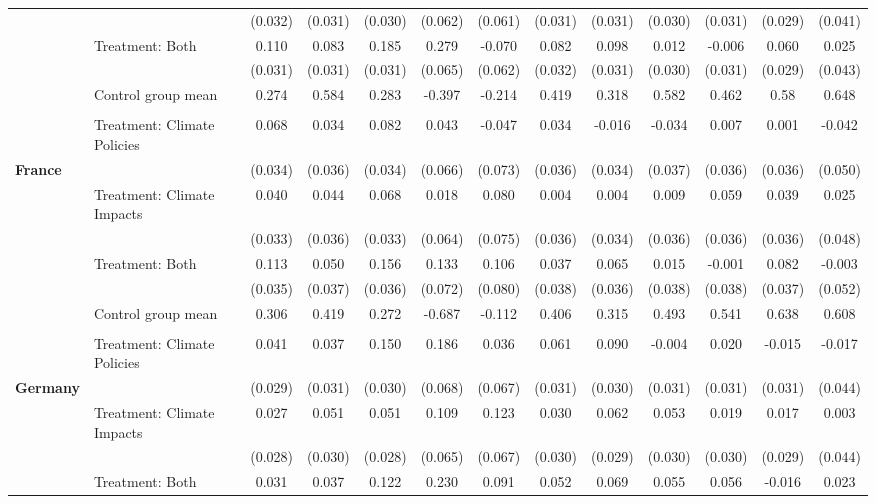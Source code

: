 \begin{tabular}[t]{llccccccccccc}
 &  & (0.032) & (0.031) & (0.030) & (0.062) & (0.061) & (0.031) & (0.031) & (0.030) & (0.031) & (0.029) & (0.041)\\
 & Treatment: Both & 0.110 & 0.083 & 0.185 & 0.279 & -0.070 & 0.082 & 0.098 & 0.012 & -0.006 & 0.060 & 0.025\\
 &  & (0.031) & (0.031) & (0.031) & (0.065) & (0.062) & (0.032) & (0.031) & (0.030) & (0.031) & (0.029) & (0.043)\\
\midrule
 & Control group mean & 0.274 & 0.584 & 0.283 & -0.397 & -0.214 & 0.419 & 0.318 & 0.582 & 0.462 & 0.58 & 0.648\\
 &  &  &  &  &  &  &  &  &  &  &  & \\
 & Treatment: Climate Policies & 0.068 & 0.034 & 0.082 & 0.043 & -0.047 & 0.034 & -0.016 & -0.034 & 0.007 & 0.001 & -0.042\\
\textbf{France} &  & (0.034) & (0.036) & (0.034) & (0.066) & (0.073) & (0.036) & (0.034) & (0.037) & (0.036) & (0.036) & (0.050)\\
 & Treatment: Climate Impacts & 0.040 & 0.044 & 0.068 & 0.018 & 0.080 & 0.004 & 0.004 & 0.009 & 0.059 & 0.039 & 0.025\\
 &  & (0.033) & (0.036) & (0.033) & (0.064) & (0.075) & (0.036) & (0.034) & (0.036) & (0.036) & (0.036) & (0.048)\\
 & Treatment: Both & 0.113 & 0.050 & 0.156 & 0.133 & 0.106 & 0.037 & 0.065 & 0.015 & -0.001 & 0.082 & -0.003\\
 &  & (0.035) & (0.037) & (0.036) & (0.072) & (0.080) & (0.038) & (0.036) & (0.038) & (0.038) & (0.037) & (0.052)\\
\midrule
 & Control group mean & 0.306 & 0.419 & 0.272 & -0.687 & -0.112 & 0.406 & 0.315 & 0.493 & 0.541 & 0.638 & 0.608\\
 &  &  &  &  &  &  &  &  &  &  &  & \\
 & Treatment: Climate Policies & 0.041 & 0.037 & 0.150 & 0.186 & 0.036 & 0.061 & 0.090 & -0.004 & 0.020 & -0.015 & -0.017\\
\textbf{Germany} &  & (0.029) & (0.031) & (0.030) & (0.068) & (0.067) & (0.031) & (0.030) & (0.031) & (0.031) & (0.031) & (0.044)\\
 & Treatment: Climate Impacts & 0.027 & 0.051 & 0.051 & 0.109 & 0.123 & 0.030 & 0.062 & 0.053 & 0.019 & 0.017 & 0.003\\
 &  & (0.028) & (0.030) & (0.028) & (0.065) & (0.067) & (0.030) & (0.029) & (0.030) & (0.030) & (0.029) & (0.044)\\
 & Treatment: Both & 0.031 & 0.037 & 0.122 & 0.230 & 0.091 & 0.052 & 0.069 & 0.055 & 0.056 & -0.016 & 0.023\\

\end{tabular}
